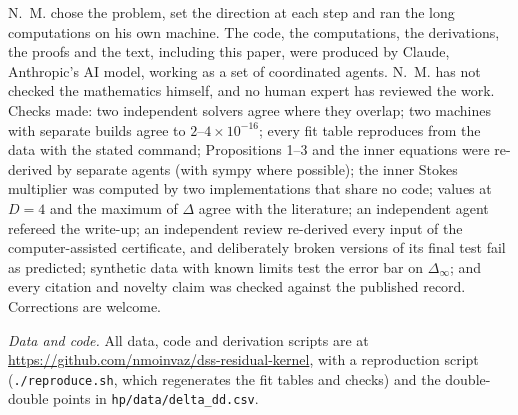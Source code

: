 \documentclass[aps,prd,onecolumn,superscriptaddress,nofootinbib,10pt]{revtex4-2}
\newcommand{\Dinf}{\Delta_\infty}
\begin{document}
N.~M. chose the problem, set the direction at each step and ran the long computations on his own machine. The code, the
computations, the derivations, the proofs and the text, including this paper, were produced by Claude, Anthropic's AI
model, working as a set of coordinated agents. N.~M. has not checked the mathematics himself, and no human expert has
reviewed the work. Checks made: two independent solvers agree where they overlap; two machines with separate builds
agree to $2$--$4\times10^{-16}$; every fit table reproduces from the data with the stated command; Propositions 1--3
and the inner equations were re-derived by separate agents (with sympy where possible); the inner Stokes multiplier was
computed by two implementations that share no code; values at $D = 4$ and the maximum of $\Delta$ agree with the
literature; an independent agent refereed the write-up; an independent review re-derived every input of the
computer-assisted certificate, and deliberately broken versions of its final test fail as predicted; synthetic data
with known limits test the error bar on $\Dinf$; and every citation and novelty claim was checked against the published
record. Corrections are welcome.

\emph{Data and code.} All data, code and derivation scripts are at
\url{https://github.com/nmoinvaz/dss-residual-kernel}, with a reproduction script (\texttt{./reproduce.sh}, which regenerates the fit tables and checks) and the
double-double points in \texttt{hp/data/delta\_dd.csv}.
\end{document}
